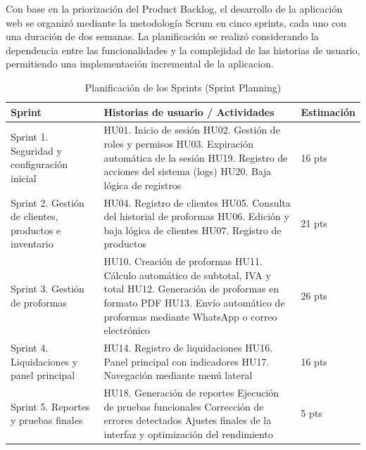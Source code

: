 Con base en la priorización del Product Backlog, el desarrollo de la aplicación web se organizó mediante la metodología Scrum en cinco sprints, cada uno con una duración de dos semanas. La planificación se realizó considerando la dependencia entre las funcionalidades y la complejidad de las historias de usuario, permitiendo una implementación incremental de la aplicacion.
\begin{table}[H]
\centering
\caption{Planificación de los Sprints (Sprint Planning)}
\label{tab:sprint_planning}
\begin{tabular}{@{}p{2cm}p{7.5cm}p{2cm}@{}}
\toprule
\textbf{Sprint} & \textbf{Historias de usuario / Actividades} & \textbf{Estimación} \\
\midrule
Sprint 1. Seguridad y configuración inicial & 
HU01. Inicio de sesión \newline
HU02. Gestión de roles y permisos \newline
HU03. Expiración automática de la sesión \newline
HU19. Registro de acciones del sistema (logs) \newline
HU20. Baja lógica de registros & 
16 pts \\
\midrule
Sprint 2. Gestión de clientes, productos e inventario & 
HU04. Registro de clientes \newline
HU05. Consulta del historial de proformas \newline
HU06. Edición y baja lógica de clientes \newline
HU07. Registro de productos & 
21 pts \\
\midrule
Sprint 3. Gestión de proformas & 
HU10. Creación de proformas \newline
HU11. Cálculo automático de subtotal, IVA y total \newline
HU12. Generación de proformas en formato PDF \newline
HU13. Envío automático de proformas mediante WhatsApp o correo electrónico & 
26 pts \\
\midrule
Sprint 4. Liquidaciones y panel principal & 
HU14. Registro de liquidaciones \newline
HU16. Panel principal con indicadores \newline
HU17. Navegación mediante menú lateral & 
16 pts \\
\midrule
Sprint 5. Reportes y pruebas finales & 
HU18. Generación de reportes \newline
Ejecución de pruebas funcionales \newline
Corrección de errores detectados \newline
Ajustes finales de la interfaz y optimización del rendimiento & 
5 pts \\
\bottomrule
\end{tabular}
\end{table}




